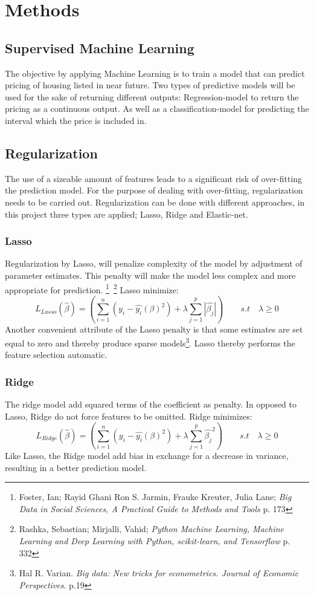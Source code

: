 \documentclass[12pt,a4paper]{article}
\begin{document}
\section{Methods}
\subsection{Supervised Machine Learning}
The objective by applying Machine Learning is to train a model that can predict pricing of housing listed in near future.
Two types of predictive models will be used for the sake of returning different outputs: Regression-model to return the pricing as a continuous output. As well as a classification-model for predicting the interval which the price is included in. 

\subsection{Regularization}
The use of a sizeable amount of features leads to a significant risk of over-fitting the prediction model. 
For the purpose of dealing with over-fitting, regularization needs to be carried out. Regularization can be done with different approaches, in this project three types are applied; Lasso, Ridge and Elastic-net.   
\subsubsection{Lasso}
Regularization by Lasso, will penalize complexity of the model by adjustment of parameter estimates. This penalty will make the model less complex and more appropriate for prediction.  \footnote{Foster, Ian; Rayid Ghani Ron S. Jarmin, Frauke Kreuter, Julia Lane; \textit{Big Data in Social Sciences, A Practical Guide to Methods and Tools} p. 173}\, \footnote{Rashka, Sebastian; Mirjalli, Vahid; \textit{Python Machine Learning, Machine Learning and Deep Learning with Python, scikit-learn, and Tensorflow} p. 332}
\newline Lasso minimize: $$L_{Lasso}(\hat{\beta}) = \left(\sum_{i=1}^{n} (y_i-\hat{y_i}(\beta)^2)+\lambda\sum_{j=1}^{p}|\hat{\beta_j}|\right) \qquad s.t \quad \lambda \geq 0 $$
Another convenient attribute of the Lasso penalty is that some estimates are set equal to zero and thereby produce sparse models\footnote{Hal R. Varian. \textit{Big data: New tricks for econometrics. Journal of Economic Perspectives}. p.19}. Lasso thereby performs the feature selection automatic.   
\subsubsection{Ridge}
The ridge model add squared terms of the coefficient as penalty. In opposed to Lasso, Ridge do not force features to be omitted. Ridge minimizes:
$$L_{Ridge}(\hat{\beta}) = \left(\sum_{i=1}^{n} (y_i-\hat{y_i}(\beta)^2)+\lambda\sum_{j=1}^{p}\hat{\beta_j}^2\right) \qquad s.t \quad \lambda \geq 0 $$ 
Like Lasso, the Ridge model add bias in exchange for a decrease in variance, resulting in a better prediction model. 
\end{document}
